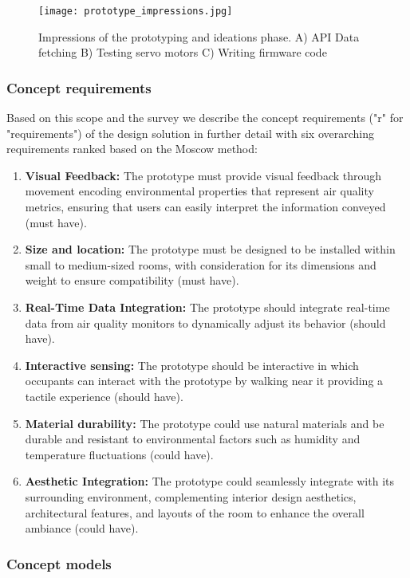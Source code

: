 \begin{figure}[b]
    \centering
    \texttt{[image: prototype\_impressions.jpg]}
    \caption{Impressions of the prototyping and ideations phase. A) API Data fetching B) Testing servo motors C) Writing firmware code}
    \label{fig:complexity}
\end{figure}

\subsubsection{Concept requirements}

Based on this scope and the survey we describe the concept requirements ("r" for "requirements") of the design solution in further detail with six overarching requirements ranked based on the Moscow method:

\begin{enumerate}
    \renewcommand{\labelenumi}{R\arabic{enumi}:}
    \item \textbf{Visual Feedback:} The prototype must provide visual feedback through movement encoding environmental properties that represent air quality metrics, ensuring that users can easily interpret the information conveyed (must have).
    \item \textbf{Size and location:} The prototype must be designed to be installed within small to medium-sized rooms, with consideration for its dimensions and weight to ensure compatibility (must have).
    \item \textbf{Real-Time Data Integration:} The prototype should integrate real-time data from air quality monitors to dynamically adjust its behavior (should have).
    \item \textbf{Interactive sensing:} The prototype should be interactive in which occupants can interact with the prototype by walking near it providing a tactile experience (should have).
    \item \textbf{Material durability:} The prototype could use natural materials and be durable and resistant to environmental factors such as humidity and temperature fluctuations (could have).
    \item \textbf{Aesthetic Integration:} The prototype could seamlessly integrate with its surrounding environment, complementing interior design aesthetics, architectural features, and layouts of the room to enhance the overall ambiance (could have).
\end{enumerate}

\subsubsection{Concept models}

